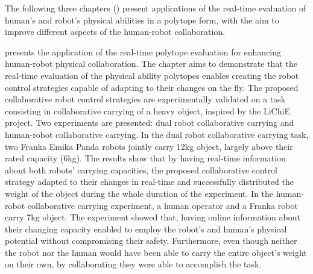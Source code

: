 
The following three chapters () present applications of the real-time evaluation of human's and robot's physical abilities in a polytope form, with the aim to improve different aspects of the human-robot collaboration.


 presents the application of the real-time polytope evaluation for enhancing human-robot physical collaboration. The chapter aims to demonstrate that the real-time evaluation of the physical ability polytopes enables creating the robot control strategies capable of adapting to their changes on the fly. The proposed collaborative robot control strategies are experimentally validated on a task consisting in collaborative carrying of a heavy object, inspired by the LiChiE project. Two experiments are presented: dual robot collaborative carrying and human-robot collaborative carrying. In the dual robot collaborative carrying task, two Franka Emika Panda robots jointly carry 12kg object, largely above their rated capacity (6kg). The results show that by having real-time information about both robots' carrying capacities, the proposed collaborative control strategy adapted to their changes in real-time and successfully distributed the weight of the object during the whole duration of the experiment. In the human-robot collaborative carrying experiment, a human operator and a Franka robot carry 7kg object. The experiment showed that, having online information about their changing capacity enabled to employ the robot's and human's physical potential without compromising their safety. Furthermore, even though neither the robot nor the human would have been able to carry the entire object's weight on their own, by collaborating they were able to accomplish the task.


